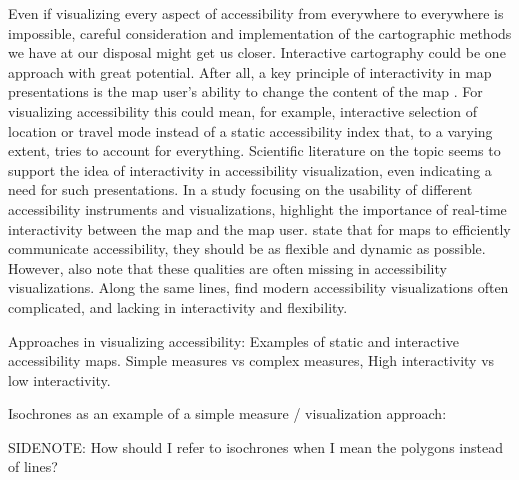 


Even if visualizing every aspect of accessibility
from everywhere to everywhere is impossible,
careful consideration and implementation
of the cartographic methods we have at our disposal might get us closer.
Interactive cartography could be one approach with great potential.
After all, a key principle of interactivity in map presentations is
the map user's ability to change the content of the map \parencite{rot2013b}.
For visualizing accessibility this could mean, for example,
interactive selection of location or travel mode instead of
a static accessibility index that, to a varying extent,
tries to account for everything.
Scientific literature on the topic seems to support the idea of
interactivity in accessibility visualization,
even indicating a need for such presentations.
In a study focusing on the usability of
different accessibility instruments and visualizations,  %
\textcite{te2014} highlight the importance of
real-time interactivity between the map and the map user.
\textcite{but2018} state that for maps to efficiently communicate accessibility,
they should be as flexible and dynamic as possible.
However, \textcite{but2018} also note that
these qualities are often missing in accessibility visualizations.
Along the same lines,
\textcite{paj2021} find modern accessibility visualizations often complicated,
and lacking in interactivity and flexibility.


Approaches in visualizing accessibility:
Examples of static and interactive accessibility maps.
Simple measures vs complex measures,
High interactivity vs low interactivity.

Isochrones as an example of a simple measure / visualization approach:


SIDENOTE: How should I refer to isochrones when I mean the polygons instead of lines?



